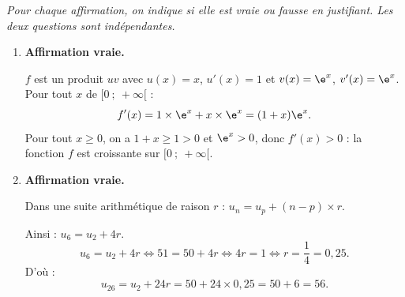 \emph{Pour chaque affirmation, on indique si elle est vraie ou fausse en justifiant. Les deux
questions sont indépendantes.}

\begin{enumerate}
	\item \textbf{Affirmation vraie.}

	$f$ est un produit $uv$ avec $u(x) = x$, $u'(x) = 1$ et $v(x) = \e^x$, $v'(x) = \e^x$.
	Pour tout $x$ de $[0~;~+\infty[$ :
	\[f'(x) = 1 \times \e^x + x \times \e^x = (1+x)\e^x.\]
	Pour tout $x \geqslant 0$, on a $1 + x \geqslant 1 > 0$ et $\e^x > 0$, donc $f'(x) > 0$ :
	la fonction $f$ est croissante sur $[0~;~+\infty[$.

	\item \textbf{Affirmation vraie.}

	Dans une suite arithmétique de raison $r$ : $u_n = u_p + (n-p) \times r$.
	
	Ainsi : $u_6 = u_2 + 4r$.
	\[u_6 = u_2 + 4r \iff 51 = 50 + 4r \iff 4r = 1 \iff r = \dfrac{1}{4} = 0,25.\]
	D'où :
	\[u_{26} = u_2 + 24r = 50 + 24 \times 0,25 = 50 + 6 = 56.\]
\end{enumerate}
